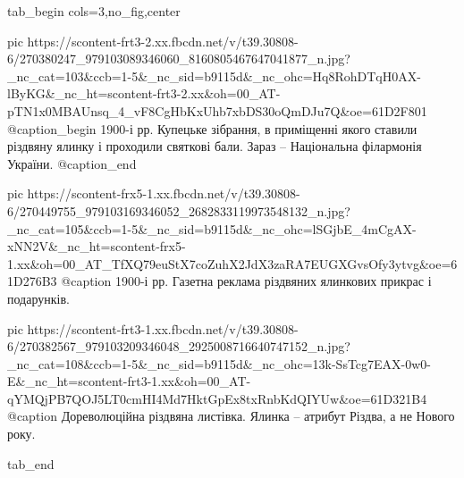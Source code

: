  
 
 
 
 

\ifcmt
  tab_begin cols=3,no_fig,center

     pic https://scontent-frt3-2.xx.fbcdn.net/v/t39.30808-6/270380247_979103089346060_8160805467647041877_n.jpg?_nc_cat=103&ccb=1-5&_nc_sid=b9115d&_nc_ohc=Hq8RohDTqH0AX-lByKG&_nc_ht=scontent-frt3-2.xx&oh=00_AT-pTN1x0MBAUnsq_4_vF8CgHbKxUhb7xbDS30oQmDJu7Q&oe=61D2F801
     @caption_begin 
      1900-і рр. Купецьке зібрання, 
      в приміщенні якого ставили різдвяну ялинку і проходили святкові бали. 
      Зараз – Національна філармонія України.
     @caption_end

     pic https://scontent-frx5-1.xx.fbcdn.net/v/t39.30808-6/270449755_979103169346052_2682833119973548132_n.jpg?_nc_cat=105&ccb=1-5&_nc_sid=b9115d&_nc_ohc=lSGjbE_4mCgAX-xNN2V&_nc_ht=scontent-frx5-1.xx&oh=00_AT_TfXQ79euStX7coZuhX2JdX3zaRA7EUGXGvsOfy3ytvg&oe=61D276B3
     @caption 1900-і рр. Газетна реклама різдвяних ялинкових прикрас і подарунків.

     pic https://scontent-frt3-1.xx.fbcdn.net/v/t39.30808-6/270382567_979103209346048_2925008716640747152_n.jpg?_nc_cat=108&ccb=1-5&_nc_sid=b9115d&_nc_ohc=13k-SsTcg7EAX-0w0-E&_nc_ht=scontent-frt3-1.xx&oh=00_AT-qYMQjPB7QOJ5LT0cmHI4Md7HktGpEx8txRnbKdQIYUw&oe=61D321B4
     @caption Дореволюційна різдвяна листівка. Ялинка – атрибут Різдва, а не Нового року.

  tab_end
\fi
